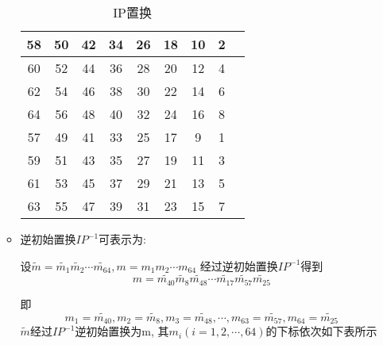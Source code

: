 \documentclass[UTF8]{ctexart}
\begin{document}
\begin{itemize}
\begin{itemize}
            \begin{table}[h]  %
            \centering  %
            \caption{IP置换}  %
                \begin{tabular}{|c|c|c|c|c|c|c|c|c|}  %
                    \hline
                    58 &50 &42 &34& 26 &18 &10 &2\\
                    \hline
                    60 &52 &44 &36 &28 &20&12 &4\\
                    \hline
                    62 &54 &46 &38 &30 &22 &14 &6\\
                    \hline
                    64 &56 &48 &40 &32 &24 &16 &8\\
                    \hline
                    57 &49 &41 &33 &25 &17 &9 &1\\
                    \hline
                    59 &51 &43 &35 &27 &19 &11 &3\\
                    \hline
                    61 &53 &45 &37 &29 &21 &13 &5\\
                    \hline
                    63 &55 &47 &39 &31 &23 &15 &7\\
                    \hline
                \end{tabular}
            \end{table}
            \item 逆初始置换$IP^{-1}$可表示为:

            设$\widetilde{m}=\widetilde{m_1}\widetilde{m_2}\cdots \widetilde{m_{64}}, m=m_1m_2\cdots m_{64}$
            经过逆初始置换$IP^{-1}$得到
            $$m=\widetilde{m_{40}}\widetilde{m_8}\widetilde{m_{48}}\cdots \widetilde{m_{17}}\widetilde{m_{57}}\widetilde{m_{25}}$$

            即
            $$m_1=\widetilde{m_{40}}, m_2=\widetilde{m_8}, m_3=\widetilde{m_{48}}, \cdots, m_{63}=\widetilde{m_{57}}, m_{64}=\widetilde{m_{25}}$$
            $\widetilde{m}$经过$IP^{-1}$逆初始置换为m, 其$m_i(i=1,2,\cdots, 64)$的下标依次如下表所示


\end{itemize}
\end{itemize}
\end{document}
